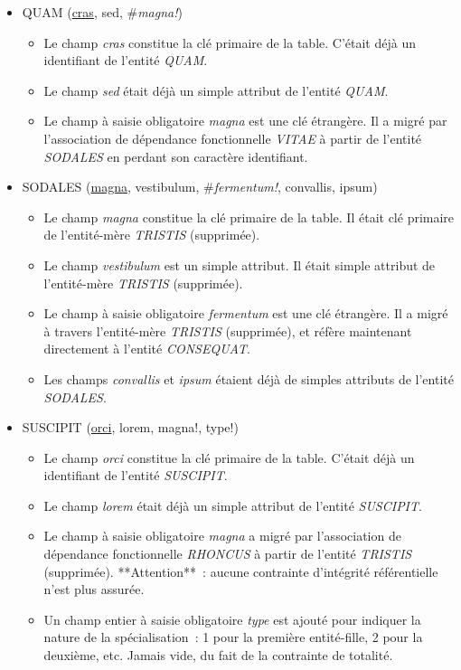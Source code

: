 \documentclass[a4paper]{article}
\newcommand{\relat}[1]{\textsc{#1}}
\newcommand{\attr}[1]{#1}
\newcommand{\prim}[1]{\uline{#1}}
\newcommand{\foreign}[1]{\#\textsl{#1}}
\begin{document}
\begin{itemize}
  \item \relat{QUAM} (\prim{cras}, \attr{sed}, \foreign{magna!})
  \begin{itemize}
    \item Le champ \emph{cras} constitue la clé primaire de la table. C'était déjà un identifiant de l'entité \emph{QUAM}.
    \item Le champ \emph{sed} était déjà un simple attribut de l'entité \emph{QUAM}.
    \item Le champ à saisie obligatoire \emph{magna} est une clé étrangère. Il a migré par l'association de dépendance fonctionnelle \emph{VITAE} à partir de l'entité \emph{SODALES} en perdant son caractère identifiant.
  \end{itemize}

  \item \relat{SODALES} (\prim{magna}, \attr{vestibulum}, \foreign{fermentum!}, \attr{convallis}, \attr{ipsum})
  \begin{itemize}
    \item Le champ \emph{magna} constitue la clé primaire de la table. Il était clé primaire de l'entité-mère \emph{TRISTIS} (supprimée).
    \item Le champ \emph{vestibulum} est un simple attribut. Il était simple attribut de l'entité-mère \emph{TRISTIS} (supprimée).
    \item Le champ à saisie obligatoire \emph{fermentum} est une clé étrangère. Il a migré à travers l'entité-mère \emph{TRISTIS} (supprimée), et réfère maintenant directement à l'entité \emph{CONSEQUAT}.
    \item Les champs \emph{convallis} et \emph{ipsum} étaient déjà de simples attributs de l'entité \emph{SODALES}.
  \end{itemize}

  \item \relat{SUSCIPIT} (\prim{orci}, \attr{lorem}, \attr{magna!}, \attr{type!})
  \begin{itemize}
    \item Le champ \emph{orci} constitue la clé primaire de la table. C'était déjà un identifiant de l'entité \emph{SUSCIPIT}.
    \item Le champ \emph{lorem} était déjà un simple attribut de l'entité \emph{SUSCIPIT}.
    \item Le champ à saisie obligatoire \emph{magna} a migré par l'association de dépendance fonctionnelle \emph{RHONCUS} à partir de l'entité \emph{TRISTIS} (supprimée). **Attention** : aucune contrainte d'intégrité référentielle n'est plus assurée.
    \item Un champ entier à saisie obligatoire \emph{type} est ajouté pour indiquer la nature de la spécialisation : 1 pour la première entité-fille, 2 pour la deuxième, etc. Jamais vide, du fait de la contrainte de totalité.
  \end{itemize}


\end{itemize}
\end{document}
